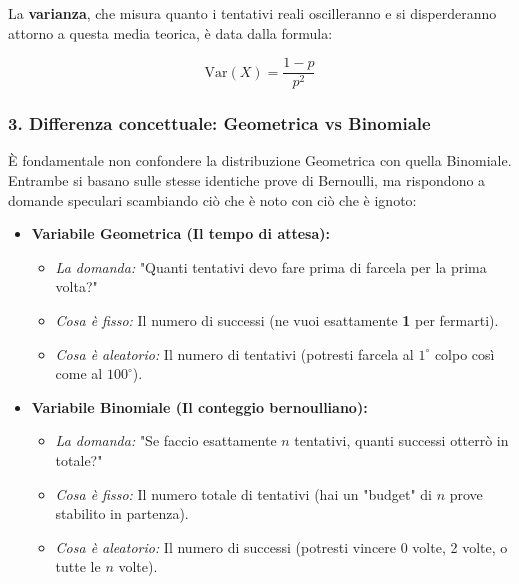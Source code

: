 La \textbf{varianza}, che misura quanto i tentativi reali oscilleranno e si disperderanno attorno a questa media teorica, è data dalla formula:

\begin{equation}
\text{Var}(X) = \frac{1 - p}{p^2}
\end{equation}

\subsubsection{3. Differenza concettuale: Geometrica vs Binomiale}

È fondamentale non confondere la distribuzione Geometrica con quella Binomiale. Entrambe si basano sulle stesse identiche prove di Bernoulli, ma rispondono a domande speculari scambiando ciò che è noto con ciò che è ignoto:

\begin{itemize}
    \item \textbf{Variabile Geometrica (Il tempo di attesa):}
    \begin{itemize}
        \item \textit{La domanda:} "Quanti tentativi devo fare prima di farcela per la prima volta?"
        \item \textit{Cosa è fisso:} Il numero di successi (ne vuoi esattamente \textbf{1} per fermarti).
        \item \textit{Cosa è aleatorio:} Il numero di tentativi (potresti farcela al $1^\circ$ colpo così come al $100^\circ$).
    \end{itemize}
    
    \vspace{0.2cm}
    
    \item \textbf{Variabile Binomiale (Il conteggio bernoulliano):}
    \begin{itemize}
        \item \textit{La domanda:} "Se faccio esattamente $n$ tentativi, quanti successi otterrò in totale?"
        \item \textit{Cosa è fisso:} Il numero totale di tentativi (hai un "budget" di \textbf{$n$} prove stabilito in partenza).
        \item \textit{Cosa è aleatorio:} Il numero di successi (potresti vincere 0 volte, 2 volte, o tutte le $n$ volte).
    \end{itemize}
\end{itemize}